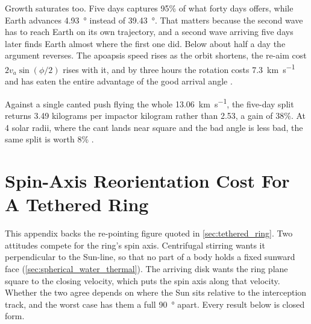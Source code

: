 \documentclass{article}
\begin{document}
Growth saturates too. Five days captures 95\% of what forty days offers, while Earth advances \SI{4.93}{\degree} instead of \SI{39.43}{\degree}. That matters because the second wave has to reach Earth on its own trajectory, and a second wave arriving five days later finds Earth almost where the first one did. Below about half a day the argument reverses. The apoapsis speed rises as the orbit shortens, the re-aim cost $2v_a\sin(\phi/2)$ rises with it, and by three hours the rotation costs \SI{7.3}{\kilo\meter\per\second} and has eaten the entire advantage of the good arrival angle \cite{Katz_aim_is_all_you_need_2025}.

Against a single canted push flying the whole \SI{13.06}{\kilo\meter\per\second}, the five-day split returns 3.49 kilograms per impactor kilogram rather than 2.53, a gain of 38\%. At 4 solar radii, where the cant lands near square and the bad angle is less bad, the same split is worth 8\% \cite{Katz_aim_is_all_you_need_2025}.

\section{Spin-Axis Reorientation Cost For A Tethered Ring}\label{sec:spin_reorientation}
This appendix backs the re-pointing figure quoted in \autoref{sec:tethered_ring}. Two attitudes compete for the ring's spin axis. Centrifugal stirring wants it perpendicular to the Sun-line, so that no part of a body holds a fixed sunward face (\autoref{sec:spherical_water_thermal}). The arriving disk wants the ring plane square to the closing velocity, which puts the spin axis along that velocity. Whether the two agree depends on where the Sun sits relative to the interception track, and the worst case has them a full \SI{90}{\degree} apart. Every result below is closed form.
\end{document}
